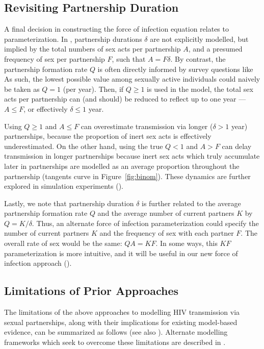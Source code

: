 \subsection{Revisiting Partnership Duration}\label{foi.prior.dur}
A final decision in constructing the force of infection equation relates to parameterization.
In , partnership durations $\delta$ are not explicitly modelled,
but implied by the total numbers of sex acts per partnership $A$,
and a presumed frequency of sex per partnership $F$, such that $A = F\delta$.
By contrast, the partnership formation rate $Q$ is often directly informed by survey questions like
As such, the lowest possible value among sexually active individuals
could naively be taken as $Q = 1$ (per year).
Then, if $Q \ge 1$ is used in the model,
the total sex acts per partnership can (and should) be reduced to reflect up to one year
--- \ie $A \le F$, or effectively $\delta \le 1$ year.
\par
Using $Q \ge 1$ and $A \le F$
can overestimate transmission via longer ($\delta > 1$ year) partnerships,
because the proportion of inert sex acts is effectively underestimated.
On the other hand, using the true $Q < 1$ and $A > F$
can delay transmission in longer partnerships
because inert sex acts which truly accumulate later in partnerships
are modelled as an average proportion throughout the partnership
(\ie tangents \vs curve in Figure~\ref{fig:binom}).
These dynamics are further explored in simulation experiments ().
\par
Lastly, we note that partnership duration $\delta$ is further related to
the average partnership formation rate $Q$ and
the average number of current partners $K$ by $Q = K/\delta$.
Thus, an alternate force of infection parameterization could specify
the number of current partners $K$ and the frequency of sex with each partner $F$.
The overall rate of sex would be the same: $QA = KF$.
In some ways, this $KF$ parameterization is more intuitive,
and it will be useful in our new force of infection approach ().
\subsection{Limitations of Prior Approaches}\label{foi.prior.lims}
The limitations of the above approaches to modelling HIV transmission via sexual partnerships,
along with their implications for existing model-based evidence,
can be summarized as follows (see also \cite{Rao2021}).
Alternate modelling frameworks which seek to overcome these limitations
are described in .
